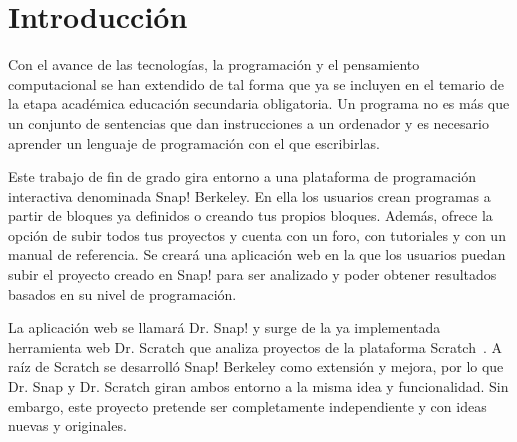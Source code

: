 \documentclass[a4paper, 12pt]{book}
\begin{document}


\tableofcontents 
\cleardoublepage
\listoffigures %



\cleardoublepage
\chapter{Introducción}
\label{sec:intro} %
Con el avance de las tecnologías, la programación y el pensamiento computacional se han extendido de tal forma que ya se incluyen en el temario de la etapa académica educación secundaria obligatoria. Un programa no es más que un conjunto de sentencias que dan instrucciones a un ordenador y es necesario aprender un lenguaje de programación con el que escribirlas.

Este trabajo de fin de grado gira entorno a una plataforma de programación interactiva denominada Snap! Berkeley. En ella los usuarios crean programas a partir de bloques ya definidos o creando tus propios bloques. Además, ofrece la opción de subir todos tus proyectos y cuenta con un foro, con tutoriales y con un manual de referencia. Se creará una aplicación web en la que los usuarios puedan subir el proyecto creado en Snap! para ser analizado y poder obtener resultados basados en su nivel de programación. 

La aplicación web se llamará Dr. Snap! y surge de la ya implementada herramienta web Dr. Scratch que analiza proyectos de la plataforma Scratch~\cite{moreno2015dr}. A raíz de Scratch se desarrolló Snap! Berkeley como extensión y mejora, por lo que Dr. Snap y Dr. Scratch giran ambos entorno a la misma idea y funcionalidad. Sin embargo, este proyecto pretende ser completamente independiente y con ideas nuevas y originales.
\end{document}
